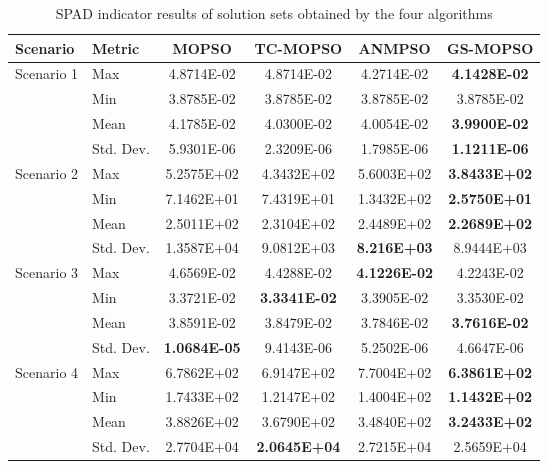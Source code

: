 \documentclass[lettersize,journal]{IEEEtran}
\begin{document}
\begin{table}[htbp]
  \centering
  \caption{SPAD indicator results of solution sets obtained by the four algorithms}
  \label{tab:SP_index_results}
  \small 
  \begin{tabular}{llcccc}
    \toprule
    \textbf{Scenario} & \textbf{Metric} & \textbf{MOPSO} & \textbf{TC-MOPSO} & \textbf{ANMPSO} & \textbf{GS-MOPSO} \\
    \midrule
    \multirow{4}{*}{Scenario 1} 
    & Max & 4.8714E-02 & 4.8714E-02 & 4.2714E-02 & \textbf{4.1428E-02} \\
    & Min & 3.8785E-02 & 3.8785E-02 & 3.8785E-02 & 3.8785E-02 \\
    & Mean & 4.1785E-02 & 4.0300E-02 & 4.0054E-02 & \textbf{3.9900E-02} \\
    & Std. Dev. & 5.9301E-06 & 2.3209E-06 & 1.7985E-06 & \textbf{1.1211E-06} \\
    \midrule
    \multirow{4}{*}{Scenario 2} 
    & Max & 5.2575E+02 & 4.3432E+02 & 5.6003E+02 & \textbf{3.8433E+02} \\
    & Min & 7.1462E+01 & 7.4319E+01 & 1.3432E+02 & \textbf{2.5750E+01} \\
    & Mean & 2.5011E+02 & 2.3104E+02 & 2.4489E+02 & \textbf{2.2689E+02} \\
    & Std. Dev. & 1.3587E+04 & 9.0812E+03 & \textbf{8.216E+03}  & 8.9444E+03 \\
    \midrule
    \multirow{4}{*}{Scenario 3} 
    & Max & 4.6569E-02 & 4.4288E-02 & \textbf{4.1226E-02} & 4.2243E-02 \\
    & Min & 3.3721E-02 & \textbf{3.3341E-02} & 3.3905E-02 & 3.3530E-02 \\
    & Mean & 3.8591E-02 & 3.8479E-02 & 3.7846E-02 & \textbf{3.7616E-02} \\
    & Std. Dev. & \textbf{1.0684E-05} & 9.4143E-06 & 5.2502E-06 & 4.6647E-06 \\
    \midrule
    \multirow{4}{*}{Scenario 4} 
    & Max & 6.7862E+02 & 6.9147E+02 & 7.7004E+02 & \textbf{6.3861E+02} \\
    & Min & 1.7433E+02 & 1.2147E+02 & 1.4004E+02 & \textbf{1.1432E+02} \\
    & Mean & 3.8826E+02 & 3.6790E+02 & 3.4840E+02 & \textbf{3.2433E+02} \\
    & Std. Dev. & 2.7704E+04 & \textbf{2.0645E+04} & 2.7215E+04 & 2.5659E+04 \\
    \bottomrule
  \end{tabular}
\end{table}
\end{document}
